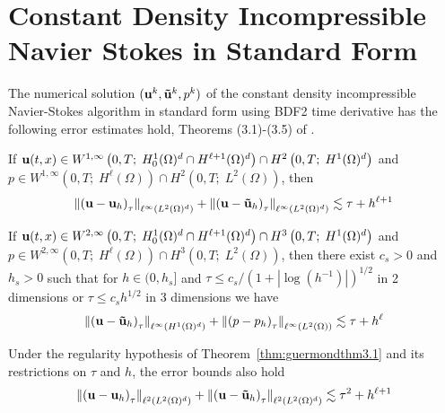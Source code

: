 \documentclass[letterpaper]{erdc}
\begin{document}
\section{Constant Density Incompressible Navier Stokes in Standard Form}
The numerical solution $(\textbf{u}^k, \mathbf{\tilde{u}}^k,p^k)$ of the constant density incompressible Navier-Stokes algorithm in standard form using BDF2 time derivative has the following error estimates hold, Theorems (3.1)-(3.5) of \cite{guermond1997resultat}.

\begin{theorem}\label{thm:guermondthm3.1}
If $\textbf{u}(t,x)\in W^{1,\infty}\left(0,T;\; H_0^1(\Omega)^d \cap H^{\ell+1}(\Omega)^d  \right) \cap H^2\left(0,T;\; H^1(\Omega)^d\right)$ and $p\in W^{1,\infty}\left(0,T;\; H^{\ell}(\Omega) \right)\cap H^2\left(0,T;\; L^2(\Omega)\right)$, then
  \begin{equation}
    \left\| \left(\textbf{u} - \textbf{u}_h \right)_{\tau} \right\|_{\ell^{\infty}\left(L^2(\Omega)^d\right)} + \left\| \left(\textbf{u} - \mathbf{\tilde{u}}_h \right)_{\tau} \right\|_{\ell^{\infty}\left(L^2(\Omega)^d\right)} \lesssim \tau + h^{\ell+1}
  \end{equation}
\end{theorem}

\begin{theorem}\label{thm:guermondthm3.2}
If $\textbf{u}(t,x)\in W^{2,\infty}\left(0,T;\; H_0^1(\Omega)^d \cap H^{\ell+1}(\Omega)^d  \right) \cap H^3\left(0,T;\; H^1(\Omega)^d\right)$ and $p\in W^{2,\infty}\left(0,T;\; H^{\ell}(\Omega) \right)\cap H^3\left(0,T;\; L^2(\Omega)\right)$, then there exist $c_s>0$ and $h_s>0$ such that for $h\in (0,h_s]$ and $\tau \leq c_s /\left(1+|\log(h^{-1})| \right)^{1/2}$ in 2 dimensions or $\tau \leq c_s h^{1/2}$ in 3 dimensions we have
  \begin{equation}
    \left\| \left(\textbf{u} - \mathbf{\tilde{u}}_h \right)_{\tau} \right\|_{\ell^{\infty}\left(H^1(\Omega)^d\right)} + \left\| \left(p - p_h \right)_{\tau} \right\|_{\ell^{\infty}\left(L^2(\Omega)\right)} \lesssim \tau + h^{\ell}
  \end{equation}
\end{theorem}

\begin{theorem}\label{thm:guermondthm3.3}
Under the regularity hypothesis of Theorem~\ref{thm:guermondthm3.1} and its restrictions on $\tau$ and $h$, the error bounds also hold
    \begin{equation}
      \left\| \left(\textbf{u} - \textbf{u}_h \right)_{\tau} \right\|_{\ell^{2}\left(L^2(\Omega)^d\right)} + \left\| \left(\textbf{u} - \mathbf{\tilde{u}}_h \right)_{\tau} \right\|_{\ell^{2}\left(L^2(\Omega)^d\right)} \lesssim \tau^2 + h^{\ell+1}
    \end{equation}
\end{theorem}
\end{document}
